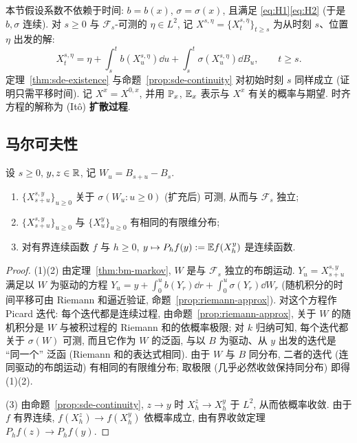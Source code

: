 本节假设系数不依赖于时间: $b=b(x)$, $\sigma=\sigma(x)$, 且满足 \eqref{eq:H1}\eqref{eq:H2} (于是 $b,\sigma$ 连续). 对 $s\ge0$ 与 $\mathcal{F}_s$-可测的 $\eta\in L^2$, 记 $X^{s,\eta}=\{X^{s,\eta}_t\}_{t\ge s}$ 为从时刻 $s$、位置 $\eta$ 出发的解:
\[
X^{s,\eta}_t=\eta+\int_s^tb(X^{s,\eta}_u)\dd u+\int_s^t\sigma(X^{s,\eta}_u)\dd B_u,\qquad t\ge s.
\]
定理~\ref{thm:sde-existence} 与命题~\ref{prop:sde-continuity} 对初始时刻 $s$ 同样成立 (证明只需平移时间). 记 $X^x=X^{0,x}$, 并用 $\P_x$, $\E_x$ 表示与 $X^x$ 有关的概率与期望. 时齐方程的解称为 (It\^o) \textbf{扩散过程}.

\subsection{马尔可夫性}

\begin{lemma}\label{lem:sde-shift}
设 $s\ge0$, $y,z\in\R$, 记 $W_u=B_{s+u}-B_s$.
\begin{enumerate}
\item $\{X^{s,y}_{s+u}\}_{u\ge0}$ 关于 $\sigma(W_u:u\ge0)$ (扩充后) 可测, 从而与 $\mathcal{F}_s$ 独立;
\item $\{X^{s,y}_{s+u}\}_{u\ge0}$ 与 $\{X^y_u\}_{u\ge0}$ 有相同的有限维分布;
\item 对有界连续函数 $f$ 与 $h\ge0$, $y\mapsto P_hf(y):=\E f(X^y_h)$ 是连续函数.
\end{enumerate}
\end{lemma}

\begin{proof}
(1)(2) 由定理~\ref{thm:bm-markov}, $W$ 是与 $\mathcal{F}_s$ 独立的布朗运动. $Y_u=X^{s,y}_{s+u}$ 满足以 $W$ 为驱动的方程 $Y_u=y+\int_0^ub(Y_r)\dd r+\int_0^u\sigma(Y_r)\dd W_r$ (随机积分的时间平移可由 Riemann 和逼近验证, 命题~\ref{prop:riemann-approx}). 对这个方程作 Picard 迭代: 每个迭代都是连续过程, 由命题~\ref{prop:riemann-approx}, 关于 $W$ 的随机积分是 $W$ 与被积过程的 Riemann 和的依概率极限; 对 $k$ 归纳可知, 每个迭代都关于 $\sigma(W)$ 可测, 而且它作为 $W$ 的泛函, 与以 $B$ 为驱动、从 $y$ 出发的迭代是 ``同一个'' 泛函 (Riemann 和的表达式相同). 由于 $W$ 与 $B$ 同分布, 二者的迭代 (连同驱动的布朗运动) 有相同的有限维分布; 取极限 (几乎必然收敛保持同分布) 即得 (1)(2).

(3) 由命题~\ref{prop:sde-continuity}, $z\to y$ 时 $X^z_h\to X^y_h$ 于 $L^2$, 从而依概率收敛. 由于 $f$ 有界连续, $f(X^z_h)\to f(X^y_h)$ 依概率成立, 由有界收敛定理 $P_hf(z)\to P_hf(y)$.
\end{proof}

